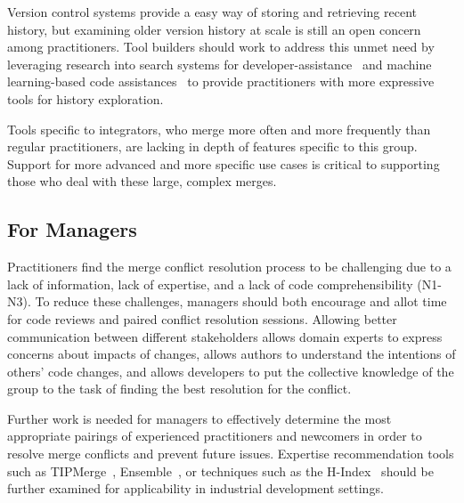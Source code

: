 Version control systems provide a easy way of storing and retrieving recent history, but examining older version history at scale is still an open concern among practitioners.
Tool builders should work to address this unmet need by leveraging research into search systems for developer-assistance~\cite{nabi2016putting} and machine learning-based code assistances~\cite{bradley2011history_exploration} to provide practitioners with more expressive tools for history exploration.

Tools specific to integrators, who merge more often and more frequently than regular practitioners, are lacking in depth of features specific to this group.
Support for more advanced and more specific use cases is critical to supporting those who deal with these large, complex merges. 

\subsection{For Managers}
Practitioners find the merge conflict resolution process to be challenging due to a lack of information, lack of expertise, and a lack of code comprehensibility (N1-N3). 
To reduce these challenges, managers should both encourage and allot time for code reviews and paired conflict resolution sessions. 
Allowing better communication between different stakeholders allows domain experts to express concerns about impacts of changes, allows authors to understand the intentions of others' code changes, and allows developers to put the collective knowledge of the group to the task of finding the best resolution for the conflict.

Further work is needed for managers to effectively determine the most appropriate pairings of experienced practitioners and newcomers in order to resolve merge conflicts and prevent future issues.
Expertise recommendation tools such as TIPMerge~\cite{CostaSarma}, Ensemble~\cite{xiang2008ensemble}, or techniques such as the H-Index~\cite{bornmann2005does} should be further examined for applicability in industrial development settings.